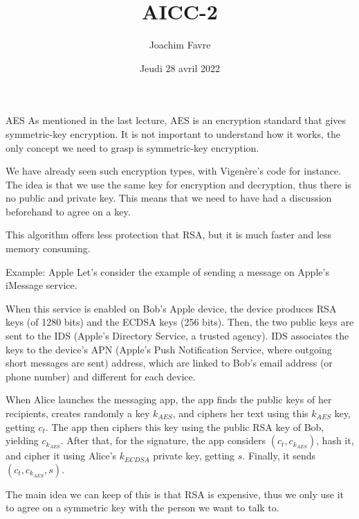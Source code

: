\documentclass[a4paper]{article}
\title{AICC-2}
\author{Joachim Favre}
\date{Jeudi 28 avril 2022}
\begin{document}
\maketitle


\begin{parag}{AES}
    As mentioned in the last lecture, AES is an encryption standard that gives symmetric-key encryption. It is not important to understand how it works, the only concept we need to grasp is symmetric-key encryption.

    We have already seen such encryption types, with Vigenère's code for instance. The idea is that we use the same key for encryption and decryption, thus there is no public and private key. This means that we need to have had a discussion beforehand to agree on a key.

    This algorithm offers less protection that RSA, but it is much faster and less memory consuming.
\end{parag}


\begin{parag}{Example: Apple}
    Let's consider the example of sending a message on Apple's iMessage service.

    When this service is enabled on Bob's Apple device, the device produces RSA keys (of 1280 bits) and the ECDSA keys (256 bits). Then, the two public keys are sent to the IDS (Apple's Directory Service, a trusted agency). IDS associates the keys to the device's APN (Apple's Push Notification Service, where outgoing short messages are sent) address, which are linked to Bob's email address (or phone number) and different for each device.

    When Alice launches the messaging app, the app finds the public keys of her recipients, creates randomly a key $k_{AES}$, and ciphers her text using this $k_{AES}$ key, getting $c_t$. The app then ciphers this key using the public RSA key of Bob, yielding $c_{k_{AES}}$. After that, for the signature, the app considers $\left(c_t, c_{k_{AES}}\right)$, hash it, and cipher it using Alice's $k_{ECDSA}$ private key, getting $s$. Finally, it sends $\left(c_t, c_{k_{AES}}, s\right)$.

    The main idea we can keep of this is that RSA is expensive, thus we only use it to agree on a symmetric key with the person we want to talk to.
\end{parag}
\end{document}
